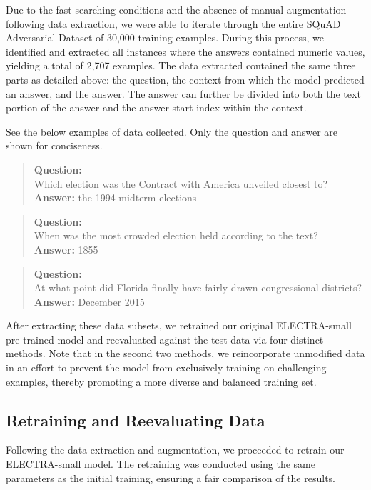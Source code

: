 \documentclass{article}
\begin{document}
Due to the fast searching conditions and the absence of manual augmentation
following data extraction, we were able to iterate
through the entire SQuAD Adversarial Dataset of 30,000 training examples.
During this process, we identified and extracted all instances
where the answers contained numeric values, yielding a total of 2,707 examples.
The data extracted contained the same three parts as detailed above:
the question, the context from which the model predicted an answer,
and the answer.
The answer can further be divided into both the text portion of
the answer and the answer start index within the context.

See the below examples of data collected.
Only the question and answer are shown for conciseness.

\begin{quote}
\textbf{Question:}\\
Which election was the Contract with America unveiled closest to?\\
\textbf{Answer:} the 1994 midterm elections
\end{quote}

\begin{quote}
\textbf{Question:}\\
When was the most crowded election held according to the text?\\
\textbf{Answer:} 1855
\end{quote}

\begin{quote}
\textbf{Question:}\\
At what point did Florida finally have fairly drawn congressional districts?\\
\textbf{Answer:} December 2015
\end{quote}

After extracting these data subsets, we retrained our original ELECTRA-small
pre-trained model and reevaluated against the test data via four distinct methods.
Note that in the second two methods, we reincorporate unmodified data
in an effort to prevent the model from exclusively training
on challenging examples, thereby promoting a more diverse and balanced training set.

\subsection{Retraining and Reevaluating Data}

Following the data extraction and augmentation, we proceeded to retrain our
ELECTRA-small model. The retraining was conducted using the same parameters
as the initial training, ensuring a fair comparison of the results.
\end{document}
